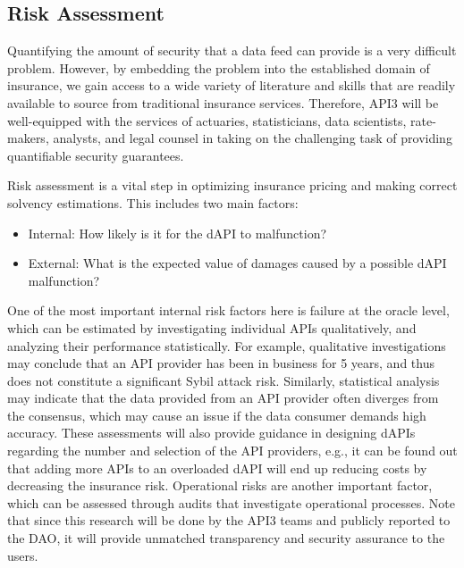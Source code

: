 \documentclass[11pt]{article}
\begin{document}
\subsection{Risk Assessment}
\label{sec:risk-assessment}

Quantifying the amount of security that a data feed can provide is a very difficult problem.
However, by embedding the problem into the established domain of insurance, we gain access to a wide variety of literature and skills that are readily available to source from traditional insurance services.
Therefore, API3 will be well-equipped with the services of actuaries, statisticians, data scientists, rate-makers, analysts, and legal counsel in taking on the challenging task of providing quantifiable security guarantees.

Risk assessment is a vital step in optimizing insurance pricing and making correct solvency estimations.
This includes two main factors:
\begin{itemize}
    \item Internal: How likely is it for the dAPI to malfunction?
    \item External: What is the expected value of damages caused by a possible dAPI malfunction?
\end{itemize}

One of the most important internal risk factors here is failure at the oracle level, which can be estimated by investigating individual APIs qualitatively, and analyzing their performance statistically.
For example, qualitative investigations may conclude that an API provider has been in business for 5 years, and thus does not constitute a significant Sybil attack risk.
Similarly, statistical analysis may indicate that the data provided from an API provider often diverges from the consensus, which may cause an issue if the data consumer demands high accuracy.
These assessments will also provide guidance in designing dAPIs regarding the number and selection of the API providers, e.g., it can be found out that adding more APIs to an overloaded dAPI will end up reducing costs by decreasing the insurance risk.
Operational risks are another important factor, which can be assessed through audits that investigate operational processes.
Note that since this research will be done by the API3 teams and publicly reported to the DAO, it will provide unmatched transparency and security assurance to the users.
\end{document}

